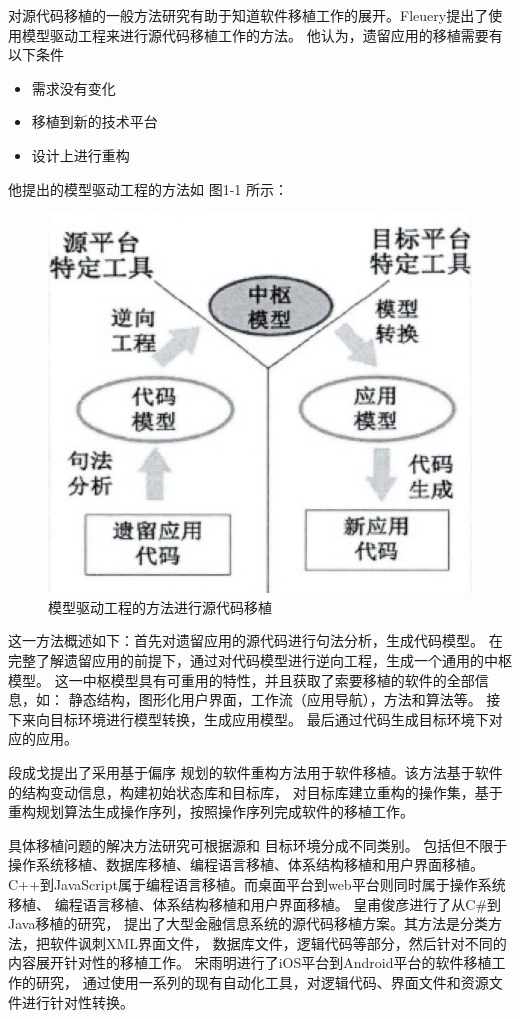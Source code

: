 对源代码移植的一般方法研究有助于知道软件移植工作的展开。Fleuery提出了使用模型驱动工程来进行源代码移植工作的方法。
他认为，遗留应用的移植需要有以下条件

\begin{itemize}
    \item 需求没有变化
    \item 移植到新的技术平台
    \item 设计上进行重构
\end{itemize}

他提出的模型驱动工程的方法如 图1-1 所示：

\begin{figure}[h!] %
    \centering
    \includegraphics[width=200bp]{figure/pic/model-driving-software-porting.png}
    \caption{模型驱动工程的方法进行源代码移植}
    \label{fig-sample}
\end{figure}

这一方法概述如下：首先对遗留应用的源代码进行句法分析，生成代码模型。
在完整了解遗留应用的前提下，通过对代码模型进行逆向工程，生成一个通用的中枢模型。
这一中枢模型具有可重用的特性，并且获取了索要移植的软件的全部信息，如：
静态结构，图形化用户界面，工作流（应用导航），方法和算法等。
接下来向目标环境进行模型转换，生成应用模型。
最后通过代码生成目标环境下对应的应用。

段成戈提出了采用基于偏序
规划的软件重构方法用于软件移植。该方法基于软件的结构变动信息，构建初始状态库和目标库，
对目标库建立重构的操作集，基于重构规划算法生成操作序列，按照操作序列完成软件的移植工作。

具体移植问题的解决方法研究可根据源和
目标环境分成不同类别。
包括但不限于操作系统移植、数据库移植、编程语言移植、体系结构移植和用户界面移植。
C++到JavaScript属于编程语言移植。而桌面平台到web平台则同时属于操作系统移植、
编程语言移植、体系结构移植和用户界面移植。
皇甫俊彦进行了从C\#到Java移植的研究，
提出了大型金融信息系统的源代码移植方案。其方法是分类方法，把软件讽刺XML界面文件，
数据库文件，逻辑代码等部分，然后针对不同的内容展开针对性的移植工作。
宋雨明进行了iOS平台到Android平台的软件移植工作的研究，
通过使用一系列的现有自动化工具，对逻辑代码、界面文件和资源文件进行针对性转换。

